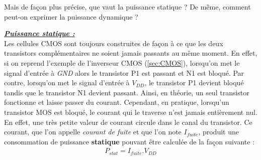 \documentclass[oneside]{book}
\begin{document}
Mais de façon plus précise, que vaut la puissance statique ? De même, comment peut-on exprimer la puissance dynamique ? 

\hspace{-0.5 cm}\underline{\textbf{\textit{Puissance statique :}}} \vspace{0.2 cm} \\
Les cellules CMOS sont toujours construites de façon à ce que les deux transistors complémentaires ne soient jamais passants au même moment. En effet, si on reprend l'exemple de l'inverseur CMOS (\ref{sec:CMOS}), lorsqu'on met le signal d'entrée à \textit{GND} alors le transistor P1 est passant et N1 est bloqué. Par contre, lorsqu'on met le signal d'entrée à \textit{$V_{DD}$}, le transistor P1 devient bloqué tandis que le transistor N1 devient passant. Ainsi, en théorie, un seul transistor fonctionne et laisse passer du courant. Cependant, en pratique, lorsqu'un transistor MOS est bloqué, le courant qui le traverse n'est jamais entièrement nul. En effet, une très petite valeur de courant circule dans le canal du transistor. Ce courant, que l'on appelle \textit{courant de fuite} et que l'on note \textit{$I_{fuite}$}, produit une consommation de puissance \textbf{statique} pouvant être calculée de la façon suivante :
\begin{gather}
	P_{stat} = I_{fuite} . V_{DD}
\end{gather}
\end{document}
